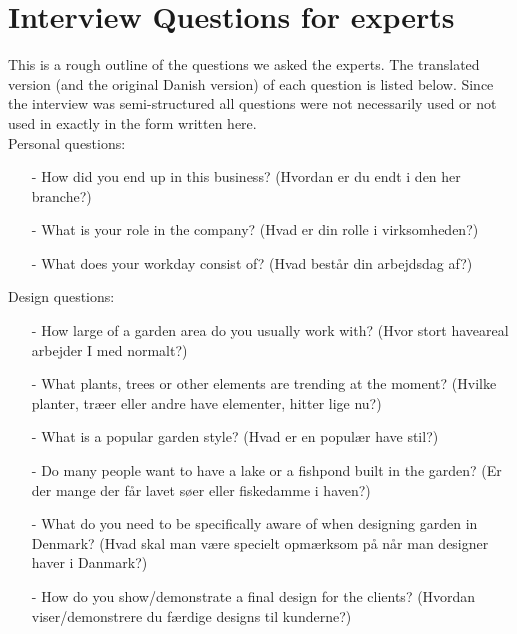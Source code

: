 \section*{Interview Questions for experts}\label{sec:interviewQuestionsExperts}
This is a rough outline of the questions we asked the experts. The translated version (and the original Danish version) of each question is listed below. Since the interview was semi-structured all questions were not necessarily used or not used in exactly in the form written here.\\

Personal questions:
\begin{itemize}
	\item[-] How did you end up in this business? (Hvordan er du endt i den her branche?)
	\item[-] What is your role in the company? (Hvad er din rolle i virksomheden?)
	\item[-] What does your workday consist of? (Hvad består din arbejdsdag af?)\\
\end{itemize}

Design questions:
\begin{itemize}
	\item[-] How large of a garden area do you usually work with? (Hvor stort haveareal arbejder I med normalt?)
	\item[-] What plants, trees or other elements are trending at the moment? (Hvilke planter, træer eller andre have elementer, hitter lige nu?)
	\item[-] What is a popular garden style? (Hvad er en populær have stil?)
	\item[-] Do many people want to have a lake or a fishpond built in the garden? (Er der mange der får lavet søer eller fiskedamme i haven?)
	\item[-] What do you need to be specifically aware of when designing garden in Denmark? (Hvad skal man være specielt opmærksom på når man designer haver i Danmark?)
	\item[-] How do you show/demonstrate a final design for the clients? (Hvordan viser/demonstrere du færdige designs til kunderne?)\\
\end{itemize}

